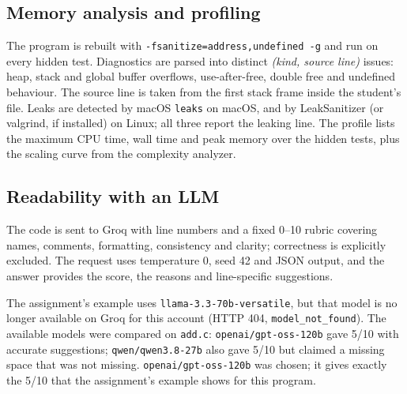 \documentclass[11pt,a4paper]{article}
\newcommand{\file}[1]{\nolinkurl{#1}}
\begin{document}
\subsection{Memory analysis and profiling}\label{sec:memory}
The program is rebuilt with \texttt{-fsanitize=address,undefined -g} and run on every hidden test. Diagnostics are
parsed into distinct \emph{(kind, source line)} issues: heap, stack and global buffer overflows, use-after-free, double
free and undefined behaviour. The source line is taken from the first stack frame inside the student's file. Leaks are
detected by macOS \texttt{leaks} on macOS, and by LeakSanitizer (or valgrind, if installed) on Linux; all three report
the leaking line. The profile lists the maximum CPU time, wall time and peak memory over the hidden tests, plus the
scaling curve from the complexity analyzer.

\subsection{Readability with an LLM}\label{sec:readability}
The code is sent to Groq with line numbers and a fixed 0--10 rubric covering names, comments, formatting, consistency
and clarity; correctness is explicitly excluded. The request uses temperature 0, seed 42 and JSON output, and the
answer provides the score, the reasons and line-specific suggestions.

The assignment's example uses \texttt{llama-3.3-70b-versatile}, but that model is no longer available on Groq for this account (HTTP 404, \texttt{model\_not\_found}). The available
models were compared on \file{add.c}: \texttt{openai/gpt-oss-120b} gave 5/10 with accurate suggestions;
\texttt{qwen/qwen3.8-27b} also gave 5/10 but claimed a missing space that was not missing. \texttt{openai/gpt-oss-120b}
was chosen; it gives exactly the 5/10 that the assignment's example shows for this program.
\end{document}
